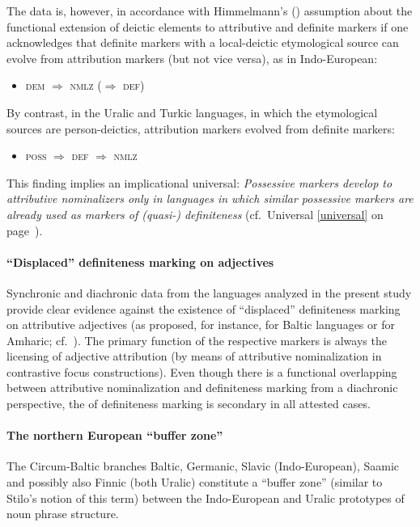 The data is, however, in accordance with Himmelmann's (\citeyear[220–221]{himmelmann1997}) assumption about the functional extension of deictic elements to attributive and definite markers if one acknowledges that definite markers with a local-deictic etymological source can evolve from attribution markers (but not vice versa), as in Indo-European:
\begin{itemize}
\item \textsc{dem $\Rightarrow$ nmlz ($\Rightarrow$ def)}
\end{itemize}

By contrast, in the Uralic and Turkic languages, in which the etymological sources are person-deictics, attribution markers evolved from definite markers:
\begin{itemize}
\item \textsc{poss $\Rightarrow$ def $\Rightarrow$ nmlz}
\end{itemize}

This finding implies an implicational universal: \textit{Possessive markers develop to attributive nominalizers only in languages in which similar possessive markers are already used as markers of (quasi-) definiteness} (cf.~Universal \ref{universal} on page~\pageref{universal}).

\paragraph*{“Displaced” definiteness marking on adjectives}
Synchronic and diachronic data from the languages analyzed in the present study provide clear evidence against the existence of “displaced” definiteness marking on attributive adjectives (as proposed, for instance, for Baltic languages or for Amharic; cf.~\citealt[122]{dahl2015a}). The primary function of the respective markers is always the licensing of adjective attribution (by means of attributive nominalization in contrastive focus constructions). Even though there is a functional overlapping between attributive nominalization and definiteness marking from a diachronic perspective, the  of definiteness marking is secondary in all attested cases.

\paragraph*{The northern European “buffer zone”}
The Circum-Baltic branches Baltic, Germanic, Slavic (Indo-European), Saamic and possibly also Finnic (both Uralic) constitute a “buffer zone” (similar to Stilo's \citeyear{stilo2005} notion of this term) between the Indo-European and Uralic prototypes of noun phrase structure.


